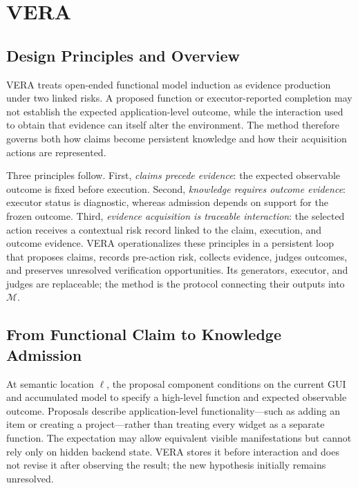 \section{VERA}
\label{sec:method}

\subsection{Design Principles and Overview}

VERA treats open-ended functional model induction as evidence production under
two linked risks. A proposed function or executor-reported completion may not
establish the expected application-level outcome, while the interaction used
to obtain that evidence can itself alter the environment. The method therefore
governs both how claims become persistent knowledge and how their acquisition
actions are represented.

Three principles follow. First, \emph{claims precede evidence}: the expected
observable outcome is fixed before execution. Second, \emph{knowledge requires
outcome evidence}: executor status is diagnostic, whereas admission depends on
support for the frozen outcome. Third, \emph{evidence acquisition is traceable
interaction}: the selected action receives a contextual risk record linked to
the claim, execution, and outcome evidence. VERA operationalizes these
principles in a persistent loop that proposes claims, records pre-action risk,
collects evidence, judges outcomes, and preserves unresolved verification
opportunities. Its generators, executor, and judges are replaceable; the method
is the protocol connecting their outputs into $\mathcal{M}$.

\subsection{From Functional Claim to Knowledge Admission}

At semantic location $\ell$, the proposal component conditions on the current
GUI and accumulated model to specify a high-level function and expected
observable outcome. Proposals describe application-level functionality---such
as adding an item or creating a project---rather than treating every widget as
a separate function. The expectation may allow equivalent visible
manifestations but cannot rely only on hidden backend state. VERA stores it
before interaction and does not revise it after observing the result; the new
hypothesis initially remains unresolved.

